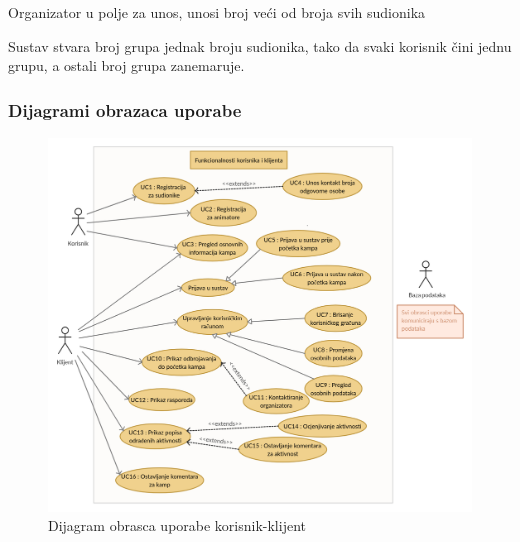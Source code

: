 \begin{packed_item}
\begin{packed_item}
\begin{packed_enum}
				\end{packed_enum}
				\item[2.b]Organizator u polje za unos, unosi broj veći od broja svih sudionika

				\item[] \begin{packed_enum}

							\item Sustav stvara broj grupa jednak broju sudionika, tako da svaki           korisnik čini jednu grupu, a ostali broj grupa zanemaruje.
				\end{packed_enum}
	\end{packed_item}
\end{packed_item}

\pagebreak

\subsubsection{Dijagrami obrazaca uporabe}
\begin{figure}[H]
	\includegraphics[scale=0.26]{dijagrami/Korisnik i klijent.jpg} %
	\centering
	\caption{Dijagram obrasca uporabe korisnik-klijent}
	\label{fig:promjene}
\end{figure}

\pagebreak

